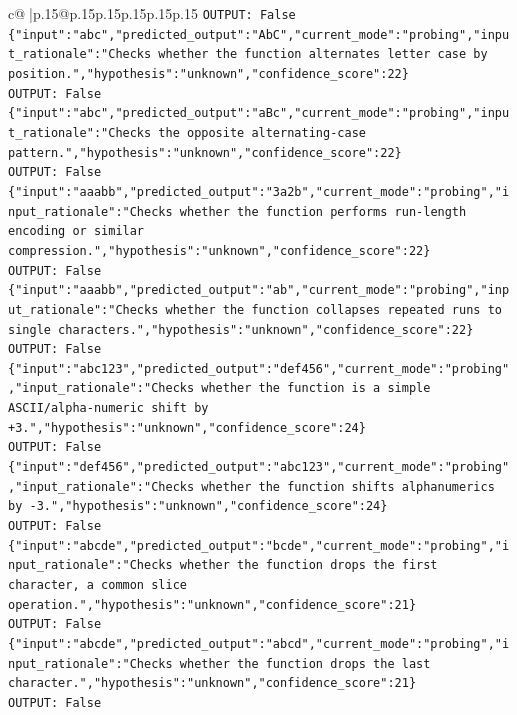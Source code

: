 \documentclass{article}
\begin{document}
{\begin{supertabular}{c@{$\;$}|p{.15\linewidth}@{}p{.15\linewidth}p{.15\linewidth}p{.15\linewidth}p{.15\linewidth}p{.15\linewidth}}
{{{\texttt{OUTPUT: False} \\
\texttt{\{"input":"abc","predicted\_output":"AbC","current\_mode":"probing","input\_rationale":"Checks whether the function alternates letter case by position.","hypothesis":"unknown","confidence\_score":22\}} \\
\texttt{OUTPUT: False} \\
\texttt{\{"input":"abc","predicted\_output":"aBc","current\_mode":"probing","input\_rationale":"Checks the opposite alternating{-}case pattern.","hypothesis":"unknown","confidence\_score":22\}} \\
\texttt{OUTPUT: False} \\
\texttt{\{"input":"aaabb","predicted\_output":"3a2b","current\_mode":"probing","input\_rationale":"Checks whether the function performs run{-}length encoding or similar compression.","hypothesis":"unknown","confidence\_score":22\}} \\
\texttt{OUTPUT: False} \\
\texttt{\{"input":"aaabb","predicted\_output":"ab","current\_mode":"probing","input\_rationale":"Checks whether the function collapses repeated runs to single characters.","hypothesis":"unknown","confidence\_score":22\}} \\
\texttt{OUTPUT: False} \\
\texttt{\{"input":"abc123","predicted\_output":"def456","current\_mode":"probing","input\_rationale":"Checks whether the function is a simple ASCII/alpha{-}numeric shift by +3.","hypothesis":"unknown","confidence\_score":24\}} \\
\texttt{OUTPUT: False} \\
\texttt{\{"input":"def456","predicted\_output":"abc123","current\_mode":"probing","input\_rationale":"Checks whether the function shifts alphanumerics by {-}3.","hypothesis":"unknown","confidence\_score":24\}} \\
\texttt{OUTPUT: False} \\
\texttt{\{"input":"abcde","predicted\_output":"bcde","current\_mode":"probing","input\_rationale":"Checks whether the function drops the first character, a common slice operation.","hypothesis":"unknown","confidence\_score":21\}} \\
\texttt{OUTPUT: False} \\
\texttt{\{"input":"abcde","predicted\_output":"abcd","current\_mode":"probing","input\_rationale":"Checks whether the function drops the last character.","hypothesis":"unknown","confidence\_score":21\}} \\
\texttt{OUTPUT: False} \\
}}}
\end{supertabular}}
\end{document}
